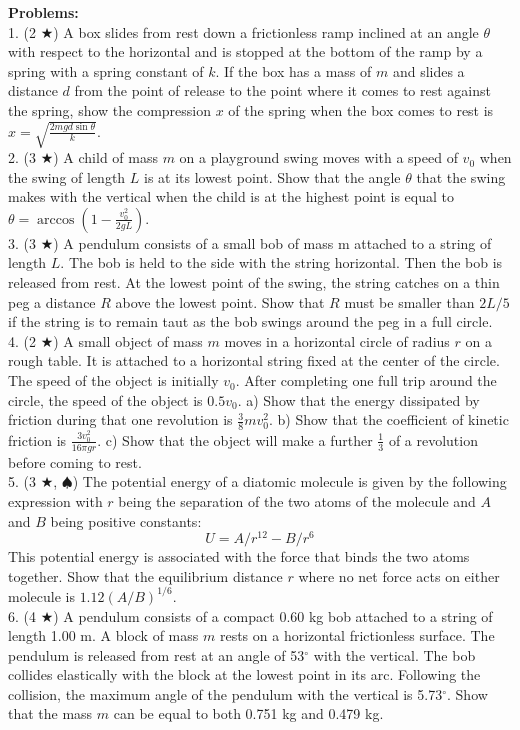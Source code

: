 \noindent \textbf{Problems:}\\
1. (2 $\bigstar$) A box slides from rest down a frictionless ramp inclined at an angle $\theta$ with respect to the horizontal and is stopped at the bottom of the ramp by a spring with a spring constant of $k$. If the box has a mass of $m$ and slides a distance $d$ from the point of release to the point where it comes to rest against the spring, show the compression $x$ of the spring when the box comes to rest is $x = \sqrt{\frac{2mgd\sin\theta}{k}}$.\\
2. (3 $\bigstar$) A child of mass $m$ on a playground swing moves with a speed of $v_0$ when the swing of length $L$ is at its lowest point. Show that the angle $\theta$ that the swing makes with the vertical when the child is at the highest point is equal to $\theta = \arccos\left(1- \frac{v_0^2}{2gL}\right)$.\\
3. (3 $\bigstar$) A pendulum consists of a small bob of mass m attached to a string of length $L$. The bob is held to the side with the string horizontal. Then the bob is released from rest. At the lowest point of the swing, the string catches on a thin peg a distance $R$ above the lowest point. Show that $R$ must be smaller than $2L/5$ if the string is to remain taut as the bob swings around the peg in a full circle. \\
4. (2 $\bigstar$)  A small object of mass $m$ moves in a horizontal circle of radius $r$ on a rough table. It is attached to a horizontal string fixed at the center of the circle. The speed of the object is initially $v_0$. After completing one full trip around the circle, the speed of the object is $0.5v_0$. a) Show that the energy dissipated by friction during that one revolution is $\frac{3}{8}mv_0^2$. b) Show that the coefficient of kinetic friction is $\frac{3v_0^2}{16\pi gr}$. c) Show that the object will make a further $\frac{1}{3}$ of a revolution before coming to rest.\\
5. (3 $\bigstar$, $\spadesuit$) The potential energy of a diatomic molecule is given by the following expression with $r$ being the separation of the two atoms of the molecule and $A$ and $B$ being positive constants: $$U = A/r^{12} - B/r^6$$ This potential energy is associated with the force that binds the two atoms together. Show that the equilibrium distance $r$ where no net force acts on either molecule is $1.12(A/B)^{1/6}$.\\
6. (4 $\bigstar$) A pendulum consists of a compact 0.60 kg bob attached to a string of length 1.00 m. A block of mass $m$ rests on a horizontal frictionless surface. The pendulum is released from rest at an angle of 53$^\circ$ with the vertical. The bob collides elastically with the block at the lowest point in its arc. Following the collision, the maximum angle of the pendulum with the vertical is 5.73$^\circ$. Show that the mass $m$ can be equal to both 0.751 kg and 0.479 kg. \\
